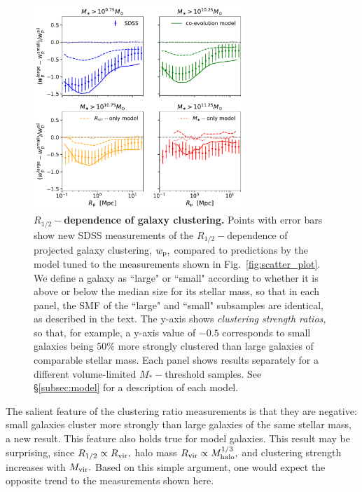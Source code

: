 \documentclass[usenatbib,usegraphicx,letterpaper]{mn2e}
\newcommand{\rhalf}{R_{1/2}}
\newcommand{\mstar}{M_{\ast}}
\newcommand{\mvir}{M_{\rm vir}}
\newcommand{\mhalo}{M_{\rm halo}}
\newcommand{\rvir}{R_{\rm vir}}
\newcommand{\wproj}{w_{\rm p}}
\begin{document}
\begin{figure}
\centering
\includegraphics[width=8cm]{FIGS/penultimate_clustering_ratios_no_orphans.pdf}
\caption{
{\bf $\rhalf-$dependence of galaxy clustering.}
Points with error bars show new SDSS measurements of the $\rhalf-$dependence of projected galaxy clustering, $\wproj,$ compared to predictions by the model tuned to the measurements shown in Fig.~\ref{fig:scatter_plot}. We define a galaxy as ``large" or ``small" according to whether it is above or below the median size for its stellar mass, so that in each panel, the SMF of the ``large" and ``small" subsamples are identical, as described in the text. The y-axis shows {\em clustering strength ratios,} so that, for example, a y-axis value of $-0.5$ corresponds to small galaxies being $50\%$ more strongly clustered than large galaxies of comparable stellar mass. Each panel shows results separately for a different volume-limited $\mstar-$threshold samples. See \S\ref{subsec:model} for a description of each model.}
\label{fig:clustering_ratio_upshot}
\end{figure}

The salient feature of the clustering ratio measurements is that they are negative: small galaxies cluster more strongly than large galaxies of the same stellar mass, a new result. This feature also holds true for model galaxies. This result may be surprising, since $\rhalf\propto\rvir,$ halo mass $\rvir\propto\mhalo^{1/3},$ and clustering strength increases with $\mvir.$ Based on this simple argument, one would expect the opposite trend to the measurements shown here. 
\end{document}
